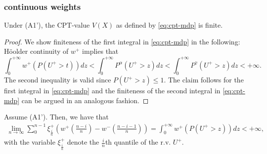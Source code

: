 \subsubsection{\holder continuous weights}
\label{sec:holder-proofs}
\begin{proposition}
\label{prop:Holder-cpt-finite}
Under (A1'), the CPT-value $V(X)$ as defined by \eqref{eq:cpt-mdp} is finite. 
\end{proposition}
\begin{proof}
We show finiteness of the first integral in \eqref{eq:cpt-mdp} in the following:
H\"{o}older continuity of $w^+$ implies that 
$$
\int_0^{+\infty} w^+(P(U^+>t)) dz 
< \int_0^{+\infty} P^{\alpha} (U^+>z) dz
< \int_0^{+\infty} P^{\gamma} (U^+>z) dz 
<+\infty.
$$
The second inequality is valid since $P(U^+>z) \leq 1$. The claim follows for the first integral in \eqref{eq:cpt-mdp} and the finiteness of the second integral in \eqref{eq:cpt-mdp} can be argued in an analogous fashion.
\end{proof}

\begin{proposition}
\label{prop:holder-quantile}
Assume (A1'). Then, we have that
\begin{align}
\lim_{n \rightarrow \infty} \sum_0^{n-1} \xi^+_{\frac{i}{n}} (w^+(\frac{n-i}{n})- w^-(\frac{n-i-1}{n}) ) = \int_0^{+\infty} w^+(P(U^+>z)) dz < +\infty,
\end{align}
with the variable $\xi^+_{\frac{i}{n}}$ denote the $\frac{i}{n}$th quantile of the 
r.v. $U^+$.
\end{proposition}

